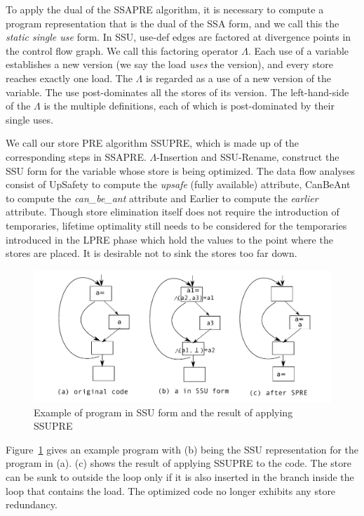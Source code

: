 To apply the dual of the SSAPRE algorithm, it is necessary to compute a program
representation that is the dual of the SSA form, and we call this the 
\emph{static single use} form.  In SSU, use-def edges are factored at
divergence points in the control flow graph.  We call this factoring operator
$\Lambda$.  Each use of a variable establishes a new version (we say the load 
\emph{uses} the version), and every store reaches exactly one load.   The
$\Lambda$ is regarded as a use of a new version of the variable.  The use
post-dominates all the stores of its version.  The left-hand-side of the
$\Lambda$ is the multiple definitions, each of which is post-dominated by their
single uses.

We call our store PRE algorithm SSUPRE, which is made up of the corresponding 
steps in SSAPRE.   $\Lambda$-Insertion and
SSU-Rename, construct the SSU form for the variable whose store is being 
optimized.  The data flow analyses consist of UpSafety to compute the
\emph{upsafe} (fully available) attribute, CanBeAnt to compute the
\emph{can\_be\_ant} attribute and Earlier to compute the \emph{earlier}
attribute.  Though store elimination itself does not require
the introduction of temporaries, lifetime optimality still needs to be
considered for the temporaries introduced in the LPRE phase which hold the 
values to the point where the stores are placed.  It is desirable not 
to sink the stores too far down.  

\begin{figure}
\centering
\includegraphics[scale=0.55]{fig-ssupre.pdf}
\caption{Example of program in SSU form and the result of applying SSUPRE}
\label{fig: ssupre}
\end{figure}

Figure~\ref{fig: ssupre} gives an example program with (b) being the SSU 
representation for the program in (a).  
(c) shows the result of applying SSUPRE to the code.
The store can be sunk to outside the loop only if it is also inserted in
the branch inside the loop that contains the load.  The optimized code no
longer exhibits any store redundancy.

